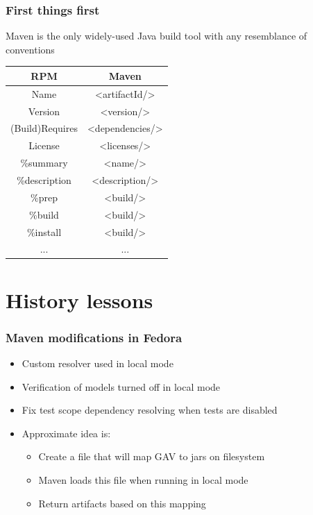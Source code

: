 \documentclass[pdftex,unicode,xcolor=table]{beamer}
\begin{document}
\begin{frame}
  \frametitle{First things first}
Maven is the only widely-used Java build tool with any resemblance of
      conventions

\begin{center}
\setlength{\tabcolsep}{2pt}
\small
\begin{tabular}{| c || c |} \hline
RPM & Maven \\ \hline
Name & \textless artifactId/\textgreater \\
Version & \textless version/\textgreater \\
(Build)Requires &  \textless dependencies/\textgreater \\
License & \textless licenses/\textgreater \\
\%summary & \textless name/\textgreater \\
\%description & \textless description/\textgreater \\
\%prep & \textless build/\textgreater \\
\%build & \textless build/\textgreater \\
\%install & \textless build/\textgreater \\
... & ... \\
\hline
\end{tabular}
\end{center}
\end{frame}

\section{History lessons}
\begin{frame}
\frametitle{Maven modifications in Fedora}
\begin{itemize}
\item Custom resolver used in local mode
\item Verification of models turned off in local mode
\item Fix test scope dependency resolving when tests are disabled
\item Approximate idea is:
  \begin{itemize}
  \item Create a file that will map GAV to jars on filesystem
  \item Maven loads this file when running in local mode
  \item Return artifacts based on this mapping
  \end{itemize}
\end{itemize}
\end{frame}
\end{document}
